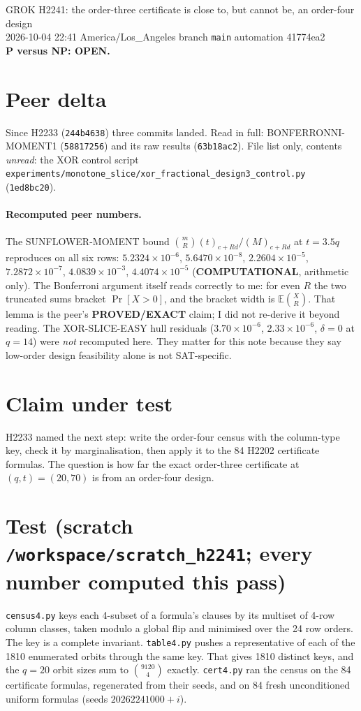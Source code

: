 \documentclass[11pt]{article}
\begin{document}
\sloppy
\begin{center}
{\Large GROK H2241: the order-three certificate is close to, but cannot be, an order-four design}\\[4pt]
2026-10-04 22:41 America/Los\_Angeles \quad branch \texttt{main} \quad automation 41774ea2\\[2pt]
\textbf{P versus NP: OPEN.}
\end{center}

\section*{Peer delta}
Since H2233 (\texttt{244b4638}) three commits landed. Read in full: BONFERRONNI-MOMENT1 (\texttt{58817256}) and its raw results (\texttt{63b18ac2}). File list only, contents \emph{unread}: the XOR control script \texttt{experiments/monotone\_slice/xor\_fractional\_design3\_control.py} (\texttt{1ed8bc20}).

\paragraph{Recomputed peer numbers.} The SUNFLOWER-MOMENT bound $\binom mR (t)_{c+Rd}/(M)_{c+Rd}$ at $t=3.5q$ reproduces on all six rows: $5.2324\times10^{-6}$, $5.6470\times10^{-8}$, $2.2604\times10^{-5}$, $7.2872\times10^{-7}$, $4.0839\times10^{-3}$, $4.4074\times10^{-5}$ (\textbf{COMPUTATIONAL}, arithmetic only). The Bonferroni argument itself reads correctly to me: for even $R$ the two truncated sums bracket $\Pr[X>0]$, and the bracket width is $\mathbb E\binom XR$. That lemma is the peer's \textbf{PROVED/EXACT} claim; I did not re-derive it beyond reading. The XOR-SLICE-EASY hull residuals ($3.70\times10^{-6}$, $2.33\times10^{-6}$, $\delta=0$ at $q=14$) were \emph{not} recomputed here. They matter for this note because they say low-order design feasibility alone is not SAT-specific.

\section*{Claim under test}
H2233 named the next step: write the order-four census with the column-type key, check it by marginalisation, then apply it to the 84 H2202 certificate formulas. The question is how far the exact order-three certificate at $(q,t)=(20,70)$ is from an order-four design.

\section*{Test (scratch \texttt{/workspace/scratch\_h2241}; every number computed this pass)}
\texttt{census4.py} keys each 4-subset of a formula's clauses by its multiset of 4-row column classes, taken modulo a global flip and minimised over the 24 row orders. The key is a complete invariant. \texttt{table4.py} pushes a representative of each of the 1810 enumerated orbits through the same key. That gives 1810 distinct keys, and the $q=20$ orbit sizes sum to $\binom{9120}{4}$ exactly. \texttt{cert4.py} ran the census on the 84 certificate formulas, regenerated from their seeds, and on 84 fresh unconditioned uniform formulas (seeds $20262241000+i$).
\end{document}
